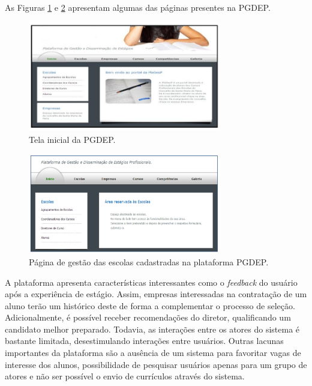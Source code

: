 As Figuras \ref{telaHomePGDEP} e \ref{telaEscolaPGDEP} apresentam algumas das páginas presentes na PGDEP.

\begin{figure}[H]
    \caption{Tela inicial da PGDEP.}
       	\begin{center}
            \includegraphics[width=0.75\textwidth]{figuras/rel03.png}
        \end{center}
    \label{telaHomePGDEP}
\end{figure}

\begin{figure}[H]
    \caption{Página de gestão das escolas cadastradas na plataforma PGDEP.}
       	\begin{center}
            \includegraphics[width=0.75\textwidth]{figuras/rel04.png}
        \end{center}
    \label{telaEscolaPGDEP}
\end{figure}

A plataforma apresenta características interessantes como o \textit{feedback} do usuário após a experiência de estágio. Assim, empresas interessadas na contratação de um aluno terão um histórico deste de forma a complementar o processo de seleção. Adicionalmente, é possível receber recomendações do diretor, qualificando um candidato melhor preparado. Todavia, as interações entre os atores do sistema é bastante limitada, desestimulando interações entre usuários. Outras lacunas importantes da plataforma são a ausência de um sistema para favoritar vagas de interesse dos alunos, possibilidade de pesquisar usuários apenas para um grupo de atores e não ser possível o envio de currículos através do sistema.


